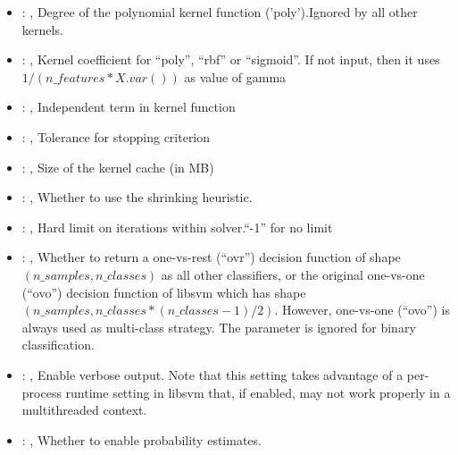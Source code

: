 \begin{itemize}
    \item {}: ,
      Degree of the polynomial kernel function ('poly').Ignored by all other kernels.

    \item {}: ,
      Kernel coefficient for ``poly'', ``rbf'' or ``sigmoid''. If not input, then it uses
      $1 / (n\_features * X.var())$ as value of gamma

    \item {}: ,
      Independent term in kernel function

    \item {}: ,
      Tolerance for stopping criterion

    \item {}: ,
      Size of the kernel cache (in MB)

    \item {}: ,
      Whether to use the shrinking heuristic.

    \item {}: ,
      Hard limit on iterations within solver.``-1'' for no limit

    \item {}: ,
      Whether to return a one-vs-rest (``ovr'') decision function of shape $(n\_samples, n\_classes)$
      as                                                            all other classifiers, or the
      original one-vs-one (``ovo'') decision function of libsvm which has
      shape $(n\_samples, n\_classes * (n\_classes - 1) / 2)$. However, one-vs-one (``ovo'') is always
      used as                                                            multi-class strategy. The
      parameter is ignored for binary classification.

    \item {}: ,
      Enable verbose output. Note that this setting takes advantage
      of a per-process runtime setting in libsvm that, if enabled, may not
      work properly in a multithreaded context.

    \item {}: ,
      Whether to enable probability estimates.


\end{itemize}
